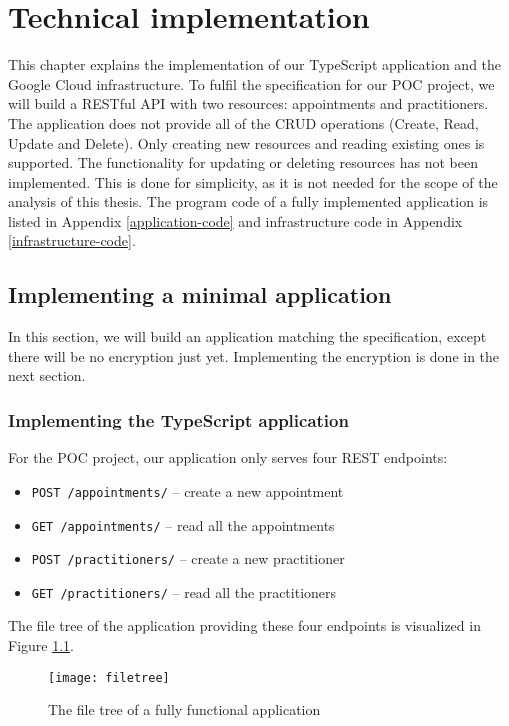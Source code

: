 \chapter{Technical implementation} \label{technical implementation}

This chapter explains the implementation of our TypeScript application and the Google Cloud infrastructure.
To fulfil the specification for our POC project, we will build a RESTful API with two resources: appointments and practitioners.
The application does not provide all of the CRUD operations (Create, Read, Update and Delete).
Only creating new resources and reading existing ones is supported.
The functionality for updating or deleting resources has not been implemented.
This is done for simplicity, as it is not needed for the scope of the analysis of this thesis.
The program code of a fully implemented application is listed in Appendix \ref{application-code} and infrastructure code in Appendix \ref{infrastructure-code}.

\section{Implementing a minimal application}

In this section, we will build an application matching the specification, except there will be no encryption just yet.
Implementing the encryption is done in the next section.

\subsection{Implementing the TypeScript application}

For the POC project, our application only serves four REST endpoints:
\begin{itemize}
    \item
    \texttt{POST /appointments/} – create a new appointment
    \item
    \texttt{GET /appointments/} – read all the appointments
    \item
    \texttt{POST /practitioners/} – create a new practitioner
    \item
    \texttt{GET /practitioners/} – read all the practitioners
\end{itemize}
The file tree of the application providing these four endpoints is visualized in Figure \ref{fig:filetree}.

\begin{figure}[!htb]
\centering
\texttt{[image: filetree]}
\caption{The file tree of a fully functional application}
\label{fig:filetree}
\end{figure}

